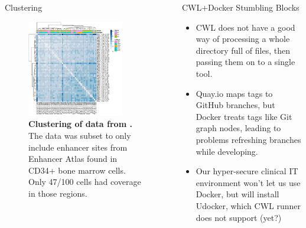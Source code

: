 \documentclass{beamer}
\begin{document}
\begin{frame}
\begin{columns}[t]
\begin{column}{.65\textwidth}
\begin{columns}[t,totalwidth=\textwidth]
\begin{column}{.48\textwidth}
\begin{block}{Clustering}
\begin{figure}
\begin{center}
\includegraphics[width=0.8\textwidth]{figures/farlik_heatmap.pdf}
\caption{\textbf{Clustering of data from \cite{Farlik2016}.} The data was subset to only include enhancer sites from Enhancer Atlas found in CD34+ bone marrow cells. Only 47/100 cells had coverage in those regions.}
\end{center}
\end{figure}


\end{block}


\end{column}

	\begin{column}{.48\textwidth}

\begin{block}{CWL+Docker Stumbling Blocks}
\begin{itemize}
\item CWL does not have a good way of processing a whole directory full of files, then passing them on to a single tool.
\item Quay.io maps tags to GitHub branches, but Docker treats tags like Git graph nodes, leading to problems refreshing branches while developing.
\item Our hyper-secure clinical IT environment won't let us use Docker, but will install Udocker, which CWL runner does not support (yet?)
\end{itemize}
\end{block}




\end{column}
\end{columns}
\end{column}
\end{columns}
\end{frame}
\end{document}
